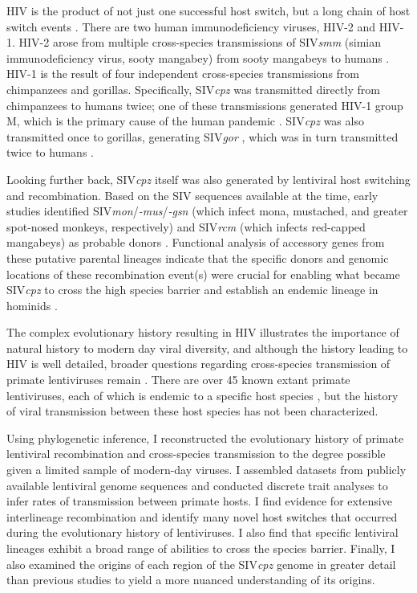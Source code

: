 HIV is the product of not just one successful host switch, but a long chain of host switch events \citep{apetrei2004history,sharp2011origins}.
There are two human immunodeficiency viruses, HIV-2 and HIV-1.
HIV-2 arose from multiple cross-species transmissions of SIV\textit{smm} (simian immunodeficiency virus, sooty mangabey) from sooty mangabeys to humans \citep{chen1996genetic,gao1992human,hirsch1989african}.
HIV-1 is the result of four independent cross-species transmissions from chimpanzees and gorillas.
Specifically, SIV\textit{cpz} was transmitted directly from chimpanzees to humans twice; one of these transmissions generated HIV-1 group M, which is the primary cause of the human pandemic \citep{gao1999origin}.
SIV\textit{cpz} was also transmitted once to gorillas, generating SIV\textit{gor} \citep{van2006human}, which was in turn transmitted twice to humans \citep{d2015origin}.

Looking further back, SIV\textit{cpz} itself was also generated by lentiviral host switching and recombination.
Based on the SIV sequences available at the time, early studies identified SIV\textit{mon}/\textit{-mus}/\textit{-gsn} (which infect mona, mustached, and greater spot-nosed monkeys, respectively) and SIV\textit{rcm} (which infects red-capped mangabeys) as probable donors \citep{bailes2003hybrid}.
Functional analysis of accessory genes from these putative parental lineages indicate that the specific donors and genomic locations of these recombination event(s) were crucial for enabling what became SIV\textit{cpz} to cross the high species barrier and establish an endemic lineage in hominids \citep{etienne2013gene}.

The complex evolutionary history resulting in HIV illustrates the importance of natural history to modern day viral diversity, and although the history leading to HIV is well detailed, broader questions regarding cross-species transmission of primate lentiviruses remain \citep{gifford2012viral}.
There are over 45 known extant primate lentiviruses, each of which is endemic to a specific host species \citep{aghokeng2007full,apetrei2004history,sharp2011origins}, but the history of viral transmission between these host species has not been characterized.

Using phylogenetic inference, I reconstructed the evolutionary history of primate lentiviral recombination and cross-species transmission to the degree possible given a limited sample of modern-day viruses.
I assembled datasets from publicly available lentiviral genome sequences and conducted discrete trait analyses to infer rates of transmission between primate hosts.
I find evidence for extensive interlineage recombination and identify many novel host switches that occurred during the evolutionary history of lentiviruses.
I also find that specific lentiviral lineages exhibit a broad range of abilities to cross the species barrier.
Finally, I also examined the origins of each region of the SIV\textit{cpz} genome in greater detail than previous studies to yield a more nuanced understanding of its origins.
\clearpage

